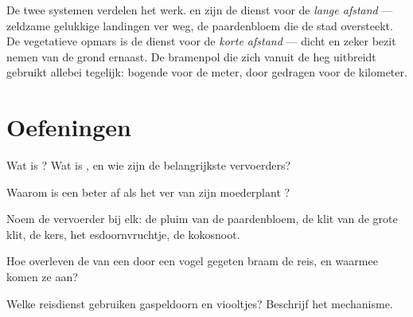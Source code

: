 \begin{remark}\label{rem:g6:how-plants-spread:twospeeds}
De twee systemen verdelen het werk.  en  zijn de dienst voor
de \emph{lange afstand} --- zeldzame gelukkige landingen ver weg, de
paardenbloem die de stad oversteekt. De vegetatieve opmars is de dienst
voor de \emph{korte afstand} --- dicht en zeker bezit nemen van de grond
ernaast. De bramenpol die zich vanuit de heg uitbreidt gebruikt allebei
tegelijk: bogende  voor de meter, door  gedragen  voor
de kilometer.
\end{remark}

\section{Oefeningen}

\begin{exercise}[$\star$]\label{exo:g6:how-plants-spread:1}
Wat is ? Wat is , en wie zijn de belangrijkste
vervoerders?
\end{exercise}

\begin{exercise}[$\star$]\label{exo:g6:how-plants-spread:2}
Waarom is een  beter af als het ver van zijn moederplant ?
\end{exercise}

\begin{exercise}[$\star$]\label{exo:g6:how-plants-spread:3}
Noem de vervoerder bij elk: de pluim van de paardenbloem, de klit van de
grote klit, de kers, het esdoornvruchtje, de kokosnoot.
\end{exercise}

\begin{exercise}[$\star$]\label{exo:g6:how-plants-spread:4}
Hoe overleven de  van een door een vogel gegeten braam de reis, en
waarmee komen ze aan?
\end{exercise}

\begin{exercise}[$\star$]\label{exo:g6:how-plants-spread:5}
Welke reisdienst gebruiken gaspeldoorn en viooltjes? Beschrijf het
mechanisme.
\end{exercise}


